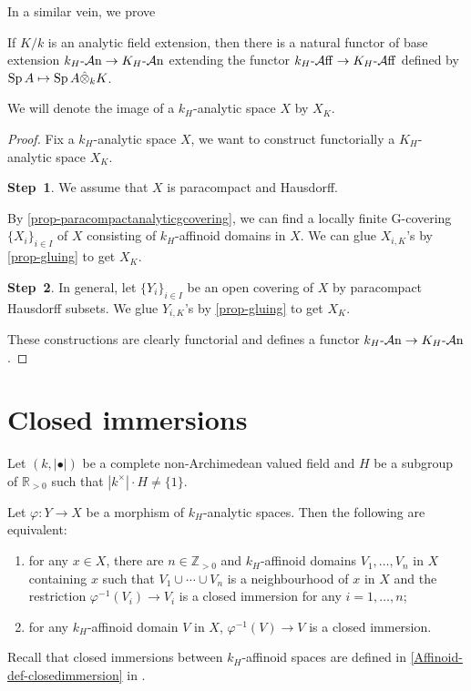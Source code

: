 In a similar vein, we prove
\begin{proposition}
    If $K/k$ is an analytic field extension, then there is a natural functor of base extension $k_H\text{-}\mathcal{A}\mathrm{n}\rightarrow K_H\text{-}\mathcal{A}\mathrm{n}$ extending the functor $k_H\text{-}\mathcal{A}\mathrm{ff}\rightarrow K_H\text{-}\mathcal{A}\mathrm{ff}$ defined by $\operatorname{Sp} A\mapsto \operatorname{Sp} A\hat{\otimes}_k K$.
\end{proposition}
We will denote the image of a $k_H$-analytic space $X$ by $X_K$.
\begin{proof}
    Fix a $k_H$-analytic space $X$, we want to construct functorially a $K_H$-analytic space $X_K$.

    \textbf{Step~1}. We assume that $X$ is paracompact and Hausdorff. 
    
    By \cref{prop-paracompactanalyticgcovering}, we can find a locally finite G-covering $\{X_i\}_{i\in I}$ of $X$ consisting of $k_H$-affinoid domains in $X$. We can glue $X_{i,K}$'s by \cref{prop-gluing} to get $X_K$.
    
    \textbf{Step~2}. In general, let $\{Y_i\}_{i\in I}$ be an open covering of $X$ by paracompact Hausdorff subsets. We glue $Y_{i,K}$'s by \cref{prop-gluing} to get $X_K$.

    These constructions are clearly functorial and defines a functor $k_H\text{-}\mathcal{A}\mathrm{n}\rightarrow K_H\text{-}\mathcal{A}\mathrm{n}$.
\end{proof}

\section{Closed immersions}
Let $(k,|\bullet|)$ be a complete non-Archimedean valued field and $H$ be a subgroup of $\mathbb{R}_{>0}$ such that $|k^{\times}|\cdot H\neq \{1\}$.

\begin{lemma}\label{lma-closedimmglocal}
    Let $\varphi:Y\rightarrow X$ be a morphism of $k_H$-analytic spaces. Then the following are equivalent:
    \begin{enumerate}
        \item for any $x\in X$, there are $n\in \mathbb{Z}_{>0}$ and $k_H$-affinoid domains $V_1,\ldots,V_n$ in $X$ containing $x$ such that $V_1\cup\cdots\cup V_n$ is a neighbourhood of $x$ in $X$ and the restriction $\varphi^{-1}(V_i)\rightarrow V_i$ is a closed immersion for any $i=1,\ldots,n$;
        \item for any $k_H$-affinoid domain $V$ in $X$, $\varphi^{-1}(V)\rightarrow V$ is a closed immersion.
    \end{enumerate}
\end{lemma}
Recall that closed immersions between $k_H$-affinoid spaces are defined in \cref{Affinoid-def-closedimmersion} in . 

